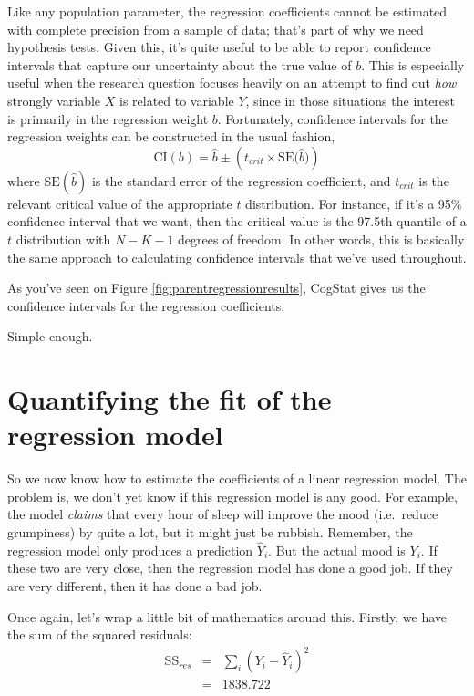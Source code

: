 \documentclass[
]{book}
\theoremstyle{definition}
\theoremstyle{definition}
\theoremstyle{definition}
\theoremstyle{definition}
\theoremstyle{remark}
\begin{document}
Like any population parameter, the regression coefficients cannot be estimated with complete precision from a sample of data; that's part of why we need hypothesis tests. Given this, it's quite useful to be able to report confidence intervals that capture our uncertainty about the true value of \(b\). This is especially useful when the research question focuses heavily on an attempt to find out \emph{how} strongly variable \(X\) is related to variable \(Y\), since in those situations the interest is primarily in the regression weight \(b\). Fortunately, confidence intervals for the regression weights can be constructed in the usual fashion,
\[
\mbox{CI}(b) = \hat{b} \pm \left( t_{crit} \times \mbox{SE}({\hat{b})}  \right)
\]
where \(\mbox{SE}({\hat{b}})\) is the standard error of the regression coefficient, and \(t_{crit}\) is the relevant critical value of the appropriate \(t\) distribution. For instance, if it's a 95\% confidence interval that we want, then the critical value is the 97.5th quantile of a \(t\) distribution with \(N-K-1\) degrees of freedom. In other words, this is basically the same approach to calculating confidence intervals that we've used throughout.

As you've seen on Figure \ref{fig:parentregressionresults}, CogStat gives us the confidence intervals for the regression coefficients.

Simple enough.

\hypertarget{r2}{%
\section{Quantifying the fit of the regression model}\label{r2}}

So we now know how to estimate the coefficients of a linear regression model. The problem is, we don't yet know if this regression model is any good. For example, the model \emph{claims} that every hour of sleep will improve the mood (i.e.~reduce grumpiness) by quite a lot, but it might just be rubbish. Remember, the regression model only produces a prediction \(\hat{Y}_i\). But the actual mood is \(Y_i\). If these two are very close, then the regression model has done a good job. If they are very different, then it has done a bad job.

Once again, let's wrap a little bit of mathematics around this. Firstly, we have the sum of the squared residuals:
\[
\begin{array}{rcl}
\mbox{SS}_{res} &=& \sum_i (Y_i - \hat{Y}_i)^2
    \\
    &=& 1838.722
\end{array}
\]
\end{document}
